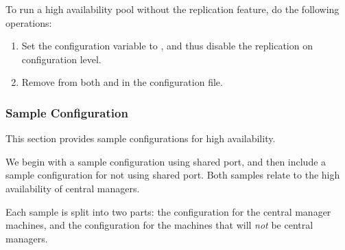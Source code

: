 To run a high availability pool without the replication feature,
do the following operations:
\begin{enumerate}
  \item Set the  configuration 
  variable to ,
  and thus disable the replication on configuration level.

  \item Remove  from both  and
   in the configuration file.
\end{enumerate}


\subsubsection{\label{sec:HA-sample-config} Sample Configuration} 
This section provides sample configurations for high availability.

We begin with a sample configuration using shared port, and then include
a sample configuration for not using shared port.  Both samples relate
to the high availability of central managers.

Each sample is split into two parts: the configuration for the
central manager machines, and the configuration for the machines
that will \emph{not} be central managers.

